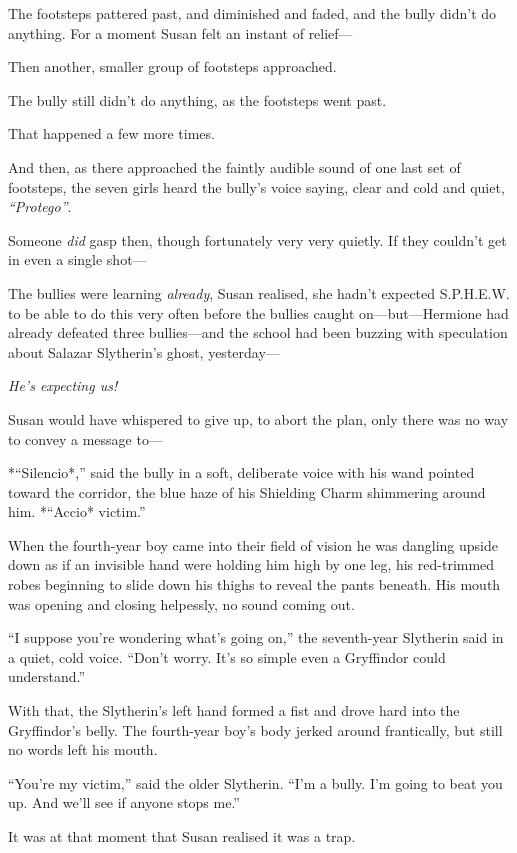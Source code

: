 The footsteps pattered past, and diminished and faded, and the bully
didn't do anything. For a moment Susan felt an instant of relief---

Then another, smaller group of footsteps approached.

The bully still didn't do anything, as the footsteps went past.

That happened a few more times.

And then, as there approached the faintly audible sound of one last set
of footsteps, the seven girls heard the bully's voice saying, clear and
cold and quiet, \emph{``Protego''}.

Someone \emph{did} gasp then, though fortunately very very quietly. If
they couldn't get in even a single shot---

The bullies were learning \emph{already}, Susan realised, she hadn't
expected S.P.H.E.W. to be able to do this very often before the bullies
caught on---but---Hermione had already defeated three bullies---and the
school had been buzzing with speculation about Salazar Slytherin's
ghost, yesterday---

\emph{He's expecting us!}

Susan would have whispered to give up, to abort the plan, only there was
no way to convey a message to---

*``Silencio*,'' said the bully in a soft, deliberate voice with his wand
pointed toward the corridor, the blue haze of his Shielding Charm
shimmering around him. *``Accio* victim.''

When the fourth-year boy came into their field of vision he was dangling
upside down as if an invisible hand were holding him high by one leg,
his red-trimmed robes beginning to slide down his thighs to reveal the
pants beneath. His mouth was opening and closing helpessly, no sound
coming out.

``I suppose you're wondering what's going on,'' the seventh-year
Slytherin said in a quiet, cold voice. ``Don't worry. It's so simple
even a Gryffindor could understand.''

With that, the Slytherin's left hand formed a fist and drove hard into
the Gryffindor's belly. The fourth-year boy's body jerked around
frantically, but still no words left his mouth.

``You're my victim,'' said the older Slytherin. ``I'm a bully. I'm going
to beat you up. And we'll see if anyone stops me.''

It was at that moment that Susan realised it was a trap.

